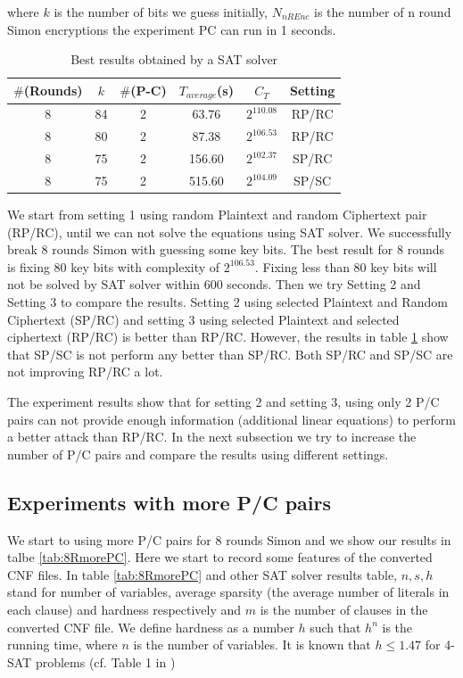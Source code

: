 where $k$ is the number of bits we guess initially, $N_{nREnc}$ is the number of n round Simon encryptions the experiment PC can run in 1 seconds.

\begin{table}[!hh]
	\caption{Best results obtained by a SAT solver}\label{tab:example1} \centering
	\begin{tabular}{|c|c|c|c|c|c|}
		\hline
		$\#$(Rounds) & $k$ & $\#$(P-C) & $T_{average}$(s) & $C_T$ & Setting \\
		\hline
		8 & 84 & 2 & 63.76   & $2^{110.08}$ & RP/RC \\
		8 & 80 & 2 & 87.38   & $2^{106.53}$ & RP/RC \\
		\hline
		8 & 75 & 2 & 156.60  & $2^{102.37}$ & SP/RC \\
		\hline
		8 & 75 & 2 & 515.60  & $2^{104.09}$ & SP/SC \\
		\hline
	\end{tabular}
\end{table}

We start from setting 1 using random Plaintext and random Ciphertext pair (RP/RC), until we can not solve the equations using SAT solver. We successfully break 8 rounds Simon with guessing some key bits. The best result for 8 rounds is fixing 80 key bits with complexity of $2^{106.53}$. Fixing less than 80 key bits will not be solved by SAT solver within 600 seconds. Then we try Setting 2 and Setting 3 to compare the results. Setting 2 using selected Plaintext and Random Ciphertext (SP/RC) and setting 3 using selected Plaintext and selected ciphertext (RP/RC) is better than RP/RC. However, the results in table \ref{tab:example1} show that SP/SC is not perform any better than SP/RC. Both SP/RC and SP/SC are not improving RP/RC a lot. 

The experiment results show that for setting 2 and setting 3, using only 2 P/C pairs can not provide enough information (additional linear equations) to perform a better attack than RP/RC. In the next subsection we try to increase the number of P/C pairs and compare the results using different settings.

\subsection{Experiments with more P/C pairs}
We start to using more P/C pairs for 8 rounds Simon and we show our results in talbe \ref{tab:8RmorePC}. Here we start to record some features of the converted CNF files. In table \ref{tab:8RmorePC} and other SAT solver results table, $n,s,h$ stand for number of variables, average sparsity (the average number of literals in each clause) and hardness respectively and $m$ is the number of clauses in the converted CNF file.
We define hardness as a number $h$ such that $h^n$ is the running time, where $n$ is the number of variables.
It is known that $h\leq 1.47$ for 4-SAT problems (cf. Table 1 in \cite{semaev})

